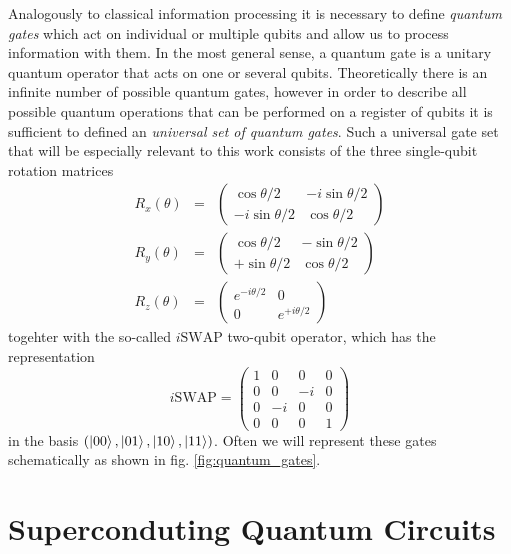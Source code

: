 Analogously to classical information processing it is necessary to define {\it quantum gates} which act on individual or multiple qubits and allow us to process information with them. In the most general sense, a quantum gate is a unitary quantum operator that acts on one or several qubits. Theoretically there is an infinite number of possible quantum gates, however in order to describe all possible quantum operations that can be performed on a register of qubits it is sufficient to defined an {\it universal set of quantum gates}. Such a universal gate set that will be especially relevant to this work consists of the three single-qubit rotation matrices
%
\begin{eqnarray}
   R_x(\theta)  & = & \left( \begin{array}{cc} \cos{\theta/2} & -i\sin{\theta/2} \\ -i\sin{\theta/2}  & \cos{\theta/2} \end{array} \right) \\ 
   R_y(\theta)  & = & \left( \begin{array}{cc} \cos{\theta/2} & -\sin{\theta/2} \\ +\sin{\theta/2} & \cos{\theta/2} \end{array} \right) \\
   R_z(\theta)  & = & \left( \begin{array}{cc} e^{-i\theta/2} & 0 \\ 0  & e^{+i\theta/2} \end{array} \right) 
\label{eq:grover_phase_decoherence}
\end{eqnarray}
%
togehter with the so-called $i\mathrm{SWAP}$ two-qubit operator, which has the representation
%
\begin{equation}
i\mathrm{SWAP} = \left( \begin{array}{cccc} 1 & 0 & 0 & 0 \\ 0 & 0 & -i & 0 \\ 0 & -i & 0 & 0 \\ 0 & 0 & 0 & 1  \end{array}  \right)
\end{equation}
%
in the basis $(\left| 00 \right>,\left| 01 \right>,\left| 10 \right>,\left| 11 \right>)$. Often we will represent these gates schematically as shown in fig. \ref{fig:quantum_gates}.

\section{Superconduting Quantum Circuits}

